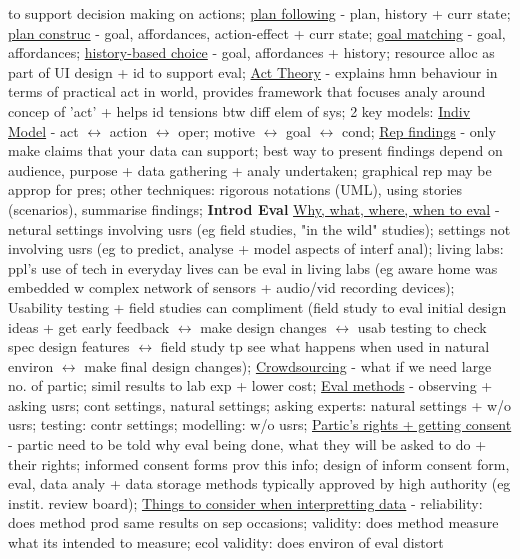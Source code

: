 \documentclass[a4paper]{article}
\begin{document}
\begin{multicols}{3}
        to support decision making on actions; \underline{plan following} - plan, history + curr state; \underline{plan construc} - goal, affordances, action-effect + curr state; \underline{goal matching} - goal,
        affordances; \underline{history-based choice} - goal, affordances + history; resource alloc as part of UI design + id to support eval; \underline{Act Theory} - explains hmn behaviour in terms of practical
        act in world, provides framework that focuses analy around concep of 'act' + helps id tensions btw diff elem of sys; 2 key models: \underline{Indiv Model} - act $\leftrightarrow$ action $\leftrightarrow$ oper; motive $\leftrightarrow$ goal $\leftrightarrow$ cond;
        \underline{Rep findings} - only make claims that your data can support; best way to present findings depend on audience, purpose + data gathering + analy undertaken;
        graphical rep may be approp for pres; other techniques: rigorous notations (UML), using stories (scenarios), summarise findings; \newline \textbf{Introd Eval} \underline{Why, what, where, when to eval} - netural settings involving usrs (eg field studies, "in the wild" studies); settings not involving usrs (eg to predict,
        analyse + model aspects of interf anal); living labs: ppl's use of tech in everyday lives can be eval in living labs (eg aware home was embedded w complex network of sensors + audio/vid recording devices); Usability
        testing + field studies can compliment (field study to eval initial design ideas + get early feedback $\leftrightarrow$ make design changes $\leftrightarrow$ usab testing to check spec design features $\leftrightarrow$ field study tp see what happens
        when used in natural environ $\leftrightarrow$ make final design changes); \underline{Crowdsourcing} - what if we need large no. of partic; simil results to lab exp + lower cost; \underline{Eval methods} - observing + asking usrs;
        cont settings, natural settings; asking experts: natural settings + w/o usrs; testing: contr settings; modelling: w/o usrs; \underline{Partic's rights + getting consent} - partic need to be told why eval being done,
        what they will be asked to do + their rights; informed consent forms prov this info; design of inform consent form, eval, data analy + data storage methods typically approved by high authority (eg instit. review board);
        \underline{Things to consider when interpretting data} - reliability: does method prod same results on sep occasions; validity: does method measure what its intended to measure; ecol validity: does environ of eval distort

\end{multicols}
\end{document}
